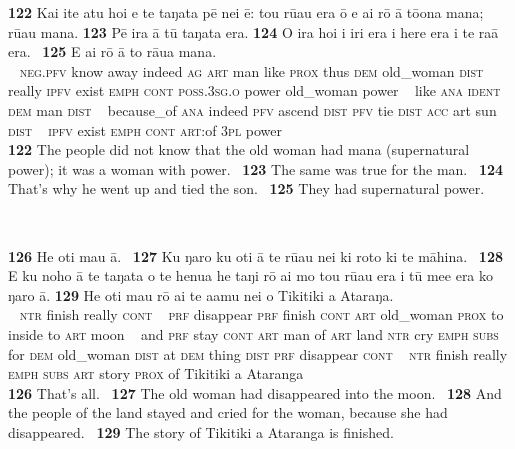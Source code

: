 {\newpage 
\gll
\textbf{\textup{122}} Kai {\ꞌ}ite atu ho{\ꞌ}i e te taŋata pē nei ē: tou rū{\ꞌ}au era {\ꞌ}ō e ai rō {\ꞌ}ā tō{\ꞌ}ona mana; rū{\ꞌ}au mana. \textbf{\textup{123}} Pē ira {\ꞌ}ā tū taŋata era. \textbf{\textup{124}} {\ꞌ}O ira ho{\ꞌ}i i iri era i here era i te ra{\ꞌ}ā era. ~\textbf{\textup{125}} E ai rō {\ꞌ}ā to rāua mana.\\
~ \textsc{neg.pfv} know away indeed \textsc{ag} \textsc{art} man like \textsc{prox} thus \textsc{dem} old\_woman \textsc{dist} really \textsc{ipfv} exist \textsc{emph} \textsc{cont} \textsc{poss.3sg.o} power old\_woman power  ~ like \textsc{ana} \textsc{ident} \textsc{dem} man \textsc{dist} ~ because\_of \textsc{ana} indeed \textsc{pfv} ascend \textsc{dist} \textsc{pfv} tie \textsc{dist} \textsc{acc} art sun \textsc{dist} ~ \textsc{ipfv} exist \textsc{emph} \textsc{cont} \textsc{art}:of \textsc{3pl} power\\

\medskip\glt
\textbf{\textup{122}} The people did not know that the old woman had mana (supernatural power); it was a woman with power. ~\textbf{\textup{123}} The same was true for the man. ~\textbf{\textup{124}} That’s why he went up and tied the son. ~\textbf{\textup{125}} They had supernatural power.


~

\bigskip\gll
\textbf{\textup{126}} He oti mau {\ꞌ}ā. ~\textbf{\textup{127}} Ku ŋaro ku oti {\ꞌ}ā te rū{\ꞌ}au nei ki roto ki te māhina. ~\textbf{\textup{128}} {\ꞌ}E ku noho {\ꞌ}ā te taŋata o te henua he taŋi rō {\ꞌ}ai mo tou rū{\ꞌ}au era {\ꞌ}i tū me{\ꞌ}e era ko ŋaro {\ꞌ}ā. \textbf{\textup{129}} He oti mau rō {\ꞌ}ai te {\ꞌ}a{\ꞌ}amu nei o Tikitiki {\ꞌ}a {\ꞌ}Ataraŋa.\\
~ \textsc{ntr} finish really \textsc{cont} ~ \textsc{prf} disappear \textsc{prf} finish \textsc{cont} \textsc{art} old\_woman \textsc{prox} to inside to \textsc{art} moon ~ and \textsc{prf} stay \textsc{cont} \textsc{art} man of \textsc{art} land \textsc{ntr} cry \textsc{emph} \textsc{subs} for \textsc{dem} old\_woman \textsc{dist} at \textsc{dem} thing \textsc{dist} \textsc{prf} disappear \textsc{cont}  ~ \textsc{ntr} finish really \textsc{emph} \textsc{subs} \textsc{art} story \textsc{prox} of Tikitiki a Ataranga\\

\medskip\glt
\textbf{\textup{126}} That’s all. ~\textbf{\textup{127}} The old woman had disappeared into the moon. ~\textbf{\textup{128}} And the people of the land stayed and cried for the woman, because she had disappeared. ~\textbf{\textup{129}} The story of Tikitiki a Ataranga is finished.

}
